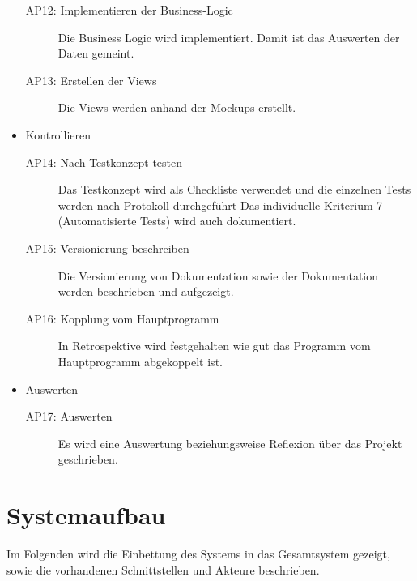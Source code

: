 \begin{itemize}
\begin{description}
        \item[AP12: Implementieren der Business-Logic] Die Business Logic wird implementiert. Damit ist das Auswerten der Daten gemeint.
        \item[AP13: Erstellen der Views] Die Views werden anhand der Mockups erstellt.
    \end{description}
    \item Kontrollieren
    \begin{description}
        \item[AP14: Nach Testkonzept testen] Das Testkonzept wird als Checkliste verwendet und die einzelnen Tests werden nach Protokoll durchgeführt \newline
        Das individuelle Kriterium 7 (Automatisierte Tests) wird auch dokumentiert.
        \item[AP15: Versionierung beschreiben] Die Versionierung von Dokumentation sowie der Dokumentation
        werden beschrieben und aufgezeigt.
        \item[AP16: Kopplung vom Hauptprogramm] In Retrospektive wird festgehalten wie gut das Programm vom Hauptprogramm abgekoppelt ist.
    \end{description}
    \item Auswerten
    \begin{description}
        \item[AP17: Auswerten] Es wird eine Auswertung beziehungsweise Reflexion über das Projekt geschrieben.
    \end{description}
\end{itemize}

\section{Systemaufbau}
Im Folgenden wird die Einbettung des Systems in das Gesamtsystem gezeigt, sowie die vorhandenen Schnittstellen und Akteure beschrieben.

